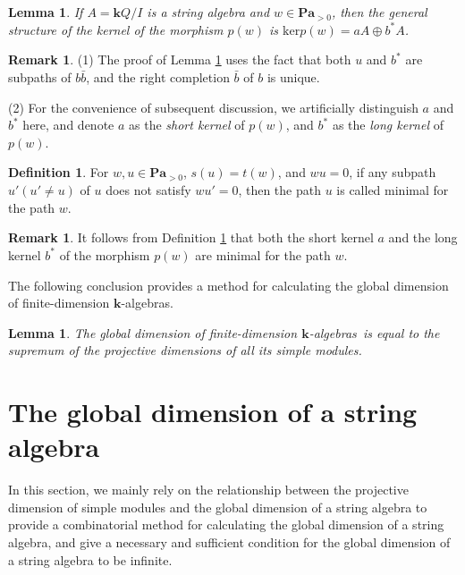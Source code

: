 \documentclass[11pt]{amsart}
\numberwithin{equation}{section}
\newtheorem{lemma}[theorem]{Lemma}
\theoremstyle{definition}
\newtheorem{remark}[theorem]{Remark}
\newtheorem{definition}[theorem]{Definition}
\begin{document}
\begin{lemma}\cite[Lemma 6]{FGR21}\label{Lem: Ker}
	If \( A = \mathbf{k}Q/I \) is a string algebra and \( w \in \textbf{Pa}_{>0} \), then the general structure of the kernel of the morphism \( p(w) \) is $\mathrm{ker}p(w) = aA \oplus b^*A$.
\end{lemma}

\begin{remark}
	(1) The proof of Lemma \ref{Lem: Ker} uses the fact that both \( u \) and \( b^* \) are subpaths of \( b\bar{b} \), and the right completion \( \bar{b} \) of \( b \) is unique.
	
	(2) For the convenience of subsequent discussion, we artificially distinguish \( a \) and \( b^* \) here, and denote \( a \) as the \emph{short kernel} of \( p(w) \), and \( b^* \) as the \emph{long kernel} of \( p(w) \).
\end{remark}


\begin{definition}\label{def:minimal sub-path}
	For \( w, u \in \textbf{Pa}_{>0} \), \( s(u) = t(w) \), and \( wu = 0 \), if any subpath \( u' (u' \neq u) \) of \( u \) does not satisfy \( wu' = 0 \), then the path \( u \) is called minimal for the path \( w \).
\end{definition}
\begin{remark}
	It follows from Definition \ref{def:minimal sub-path} that both the short kernel \( a \) and the long kernel \( b^* \) of the morphism \( p(w) \) are minimal for the path \( w \).
\end{remark}
 
The following conclusion provides a method for calculating the global dimension of finite-dimension $\mathbf{k}$-algebras.
\begin{lemma}\cite{We04}\label{lem:gldimA}
	The global dimension of finite-dimension $\mathbf{k}$-algebras is equal to the supremum of the projective dimensions of all its simple modules.
\end{lemma}







\section{The global dimension of a string algebra}\label{The global dimension of a string algebra}

In this section, we mainly rely on the relationship between the projective dimension of simple modules and the global dimension of a string algebra  to provide a combinatorial method for calculating the global dimension of a string algebra, and give a necessary and sufficient condition for the global dimension of a string algebra to be infinite.
\end{document}
